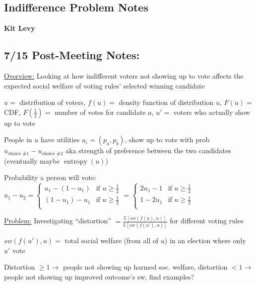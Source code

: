 \documentclass[12pt]{article}
\begin{document}
\setlength{\parindent}{0pt}
\setlength{\parskip}{2pt plus1pt}
\setlength{\baselineskip}{10pt plus1pt}

\subsection*{Indifference Problem Notes}
\textbf{Kit Levy}

\subsection*{7/15 Post-Meeting Notes:}

\underline{Overview:} Looking at how indifferent voters not showing up to vote affects the expected social welfare of voting rules' selected winning candidate
\newline

$u =$ distribution of voters, $f(u) =$ density function of distribution $u$, $F(u) =$ CDF, $F(\frac{1}{2}) =$ number of votes for candidate $a$, $u' =$  voters who actually show up to vote

People in $u$ have utilities $u_i = (p_a, p_b)$, show up to vote with prob $u_{\text{choice \#}1} - u_{\text{choice \#}2}$ aka strength of preference between the two candidates (eventually maybe $\operatorname{entropy}(u)$)

Probability a person will vote: $u_1 - u_2 = \begin{cases} 
u_1 - (1-u_1) & \text{if } u \geq \frac{1}{2} \\
(1 - u_1) - u_1 & \text{if } u \geq \frac{1}{2}\\
\end{cases} = \begin{cases} 
2u_1 - 1 & \text{if } u \geq \frac{1}{2} \\
1 - 2u_1 & \text{if } u \geq \frac{1}{2}\\
\end{cases}$
\newline \newline

\underline{Problem:} Investigating ``distortion'' $ = \frac{\mathbb{E}[sw(f(u), u)]}{\mathbb{E}[sw(f(u'), u)]}$ for different voting rules

$sw(f(u'), u) =$ total social welfare (from all of $u$) in an election where only $u'$ vote

Distortion $\geq 1 \rightarrow$ people not showing up harmed soc. welfare, distortion $< 1 \rightarrow$ people not showing up improved outcome's sw, find examples?
\end{document}
